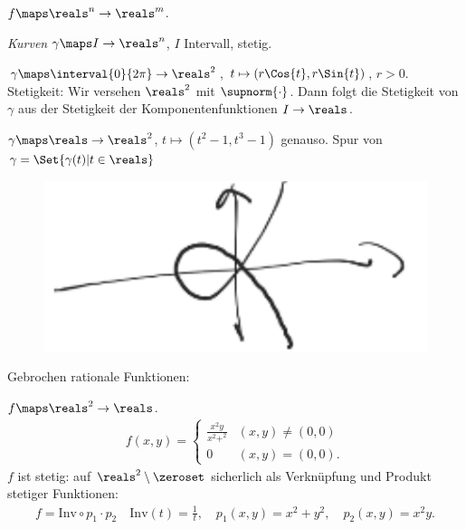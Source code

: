 \begin{beispiele}
    \( f\maps \reals^n\to \reals^m \).
    \begin{eigenschaftenenumerate}
        \item \emph{Kurven} \( \gamma\maps I\to \reals^n \), \( I \) Intervall, stetig.
        \begin{beispiele*}
            \item \( \gamma\maps \interval{0}{2\pi}\to \reals^2 \), \( t\mapsto (r \Cos{t}, r \Sin{t}) \), \( r>0 \).
            Stetigkeit: Wir versehen \( \reals^2 \) mit \( \supnorm{\cdot} \).
            Dann folgt die Stetigkeit von \( \gamma \) aus der Stetigkeit der Komponentenfunktionen \( I\to \reals \).
            \item \( \gamma\maps \reals\to \reals^2 \), \( t\mapsto (t^2-1,t^3-1) \) genauso.
            Spur von \( \gamma=\Set{\gamma(t)|t\in \reals} \)
            \begin{figure}[H]
                \centering
                \includegraphics[width=0.5\linewidth]{figures/komponentenstetigkeit_beispiel_hoch_2_gegen_hoch_3}
                \label{fig:komponentenstetigkeit_beispiel_hoch_2_gegen_hoch_3}
            \end{figure}
        \end{beispiele*}
        \item\label{stetigkeit:beispiel:gebrochen_rationale_funktionen} Gebrochen rationale Funktionen:
        \begin{beispiele*}
            \item \( f\maps \reals^2\to \reals \).
            \begin{align*}
                f(x,y)=\begin{cases}
                    \frac{x^2y}{x^2+^2}&(x,y)\neq (0,0)\\
                    0&(x,y)=(0,0).
                \end{cases}                
            \end{align*}
            \( f \) ist stetig: auf \( \reals^2\setminus \zeroset \) sicherlich als Verknüpfung und Produkt stetiger Funktionen:
            \begin{align*}
                f=\text{Inv}\circ p_1\cdot p_2\quad \text{Inv}(t)=\frac{1}{t},\quad p_1(x,y)=x^2+y^2,\quad p_2(x,y)=x^2y.

\end{align*}
\end{beispiele*}
\end{eigenschaftenenumerate}
\end{beispiele}
